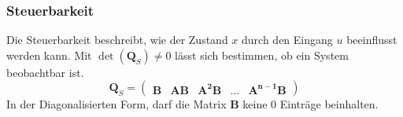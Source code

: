 \subsubsection{Steuerbarkeit}
Die Steuerbarkeit beschreibt, wie der Zustand $x$ durch den Eingang $u$ beeinflusst werden kann.
Mit $\det(\mathbf{Q}_S) \neq 0$ lässt sich bestimmen, ob ein System beobachtbar ist.
\[
\mathbf{Q}_S = \begin{pmatrix}
	\mathbf{B} &
	\mathbf{AB} &
	\mathbf{A^2B} &
	\dots&
	\mathbf{A^{n-1}B} 
\end{pmatrix}
\]
In der Diagonalisierten Form, darf die Matrix $\mathbf{B}$ keine $0$ Einträge beinhalten.

